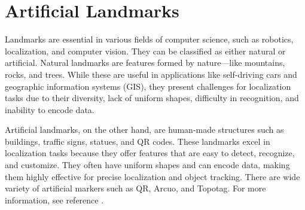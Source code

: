 \section{Artificial Landmarks}

Landmarks are essential in various fields of computer science, such as robotics, localization, and computer vision. They can be classified as either natural or artificial. Natural landmarks are features formed by nature—like mountains, rocks, and trees. While these are useful in applications like self-driving cars and geographic information systems (GIS), they present challenges for localization tasks due to their diversity, lack of uniform shapes, difficulty in recognition, and inability to encode data.

Artificial landmarks, on the other hand, are human-made structures such as buildings, traffic signs, statues, and QR codes. These landmarks excel in localization tasks because they offer features that are easy to detect, recognize, and customize. They often have uniform shapes and can encode data, making them highly effective for precise localization and object tracking. There are wide variety of artificial markers such as QR, Arcuo, and Topotag. For more information, see reference \cite{kalaitzakis2021}.
	
